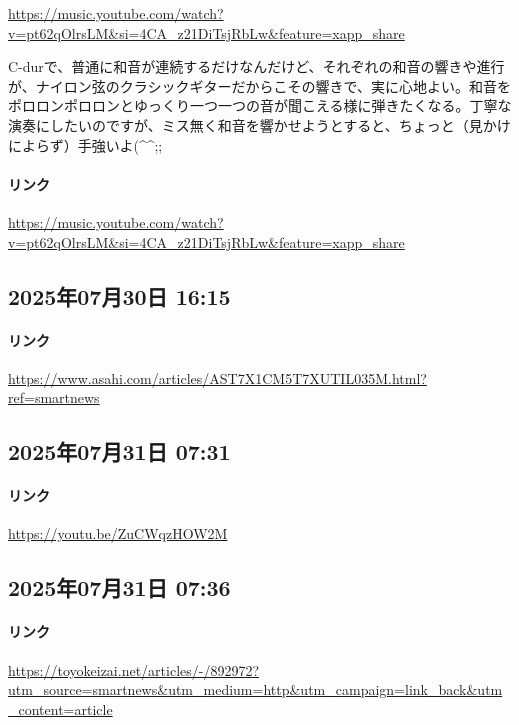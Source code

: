 \url{https://music.youtube.com/watch?v=pt62qOlrsLM&si=4CA_z21DiTsjRbLw&feature=xapp_share}

C-durで、普通に和音が連続するだけなんだけど、それぞれの和音の響きや進行が、ナイロン弦のクラシックギターだからこその響きで、実に心地よい。和音をポロロンポロロンとゆっくり一つ一つの音が聞こえる様に弾きたくなる。丁寧な演奏にしたいのですが、ミス無く和音を響かせようとすると、ちょっと（見かけによらず）手強いよ(\textasciicircum{}\textasciicircum{};;

\paragraph{リンク}
\url{https://music.youtube.com/watch?v=pt62qOlrsLM&si=4CA_z21DiTsjRbLw&feature=xapp_share}

\subsection*{2025年07月30日 16:15}

\paragraph{リンク}
\url{https://www.asahi.com/articles/AST7X1CM5T7XUTIL035M.html?ref=smartnews}

\subsection*{2025年07月31日 07:31}

\paragraph{リンク}
\url{https://youtu.be/ZuCWqzHOW2M}

\subsection*{2025年07月31日 07:36}

\paragraph{リンク}
\url{https://toyokeizai.net/articles/-/892972?utm_source=smartnews&utm_medium=http&utm_campaign=link_back&utm_content=article}

